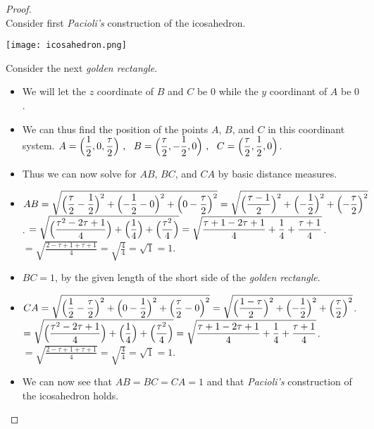 \documentclass[12pt]{article}
\theoremstyle{plain}
\begin{document}
\begin{proof}
  \ \\
  Consider first \textit{Pacioli's} construction of the icosahedron. \\
  \begin{center}
    \texttt{[image: icosahedron.png]}
  \end{center}
  Consider the next \textit{golden rectangle}. \\
  \begin{center}
  \end{center}
  \begin{itemize}
    \item We will let the $z$ coordinate of $B$ and $C$ be $0$ while the $y$ coordinant of $A$ be $0$.
    \item We can thus find the position of the points $A$, $B$, and $C$ in this coordinant system.
    \subitem $ \displaystyle A = \Bigl( \frac{1}{2}, 0, \frac{\tau}{2} \Bigr) \ , \ \ B = \Bigl( \frac{\tau}{2}, -\frac{1}{2}, 0 \Bigr) \ , \ \ C = \Bigl( \frac{\tau}{2}, \frac{1}{2}, 0 \Bigr) $.
    \item Thus we can now solve for $AB$, $BC$, and $CA$ by basic distance measures.
    \item $ \displaystyle AB = \sqrt{\Bigl( \frac{\tau}{2} - \frac{1}{2} \Bigr)^2 + \Bigl( -\frac{1}{2} - 0 \Bigr)^2 + \Bigl( 0 - \frac{\tau}{2} \Bigr)^2} = \sqrt{\Bigl( \frac{\tau - 1}{2} \Bigr)^2 + \Bigl( -\frac{1}{2} \Bigr)^2 + \Bigl( - \frac{\tau}{2} \Bigr)^2} $.
    \subitem $ \displaystyle = \sqrt{\Bigl( \frac{\tau^2 -2\tau + 1}{4} \Bigr) + \Bigl( \frac{1}{4} \Bigr) + \Bigl( \frac{\tau^2}{4} \Bigr)} = \sqrt{ \frac{\tau + 1 -2\tau + 1}{4} + \frac{1}{4} + \frac{\tau + 1}{4} } $.
    \subitem $ \displaystyle = \sqrt{ \frac{2 -\tau + 1 + \tau + 1}{4} } = \sqrt{\frac{4}{4}} = \sqrt{1} = 1 $.
    \item $ BC = 1 $, by the given length of the short side of the \textit{golden rectangle}.
    \item $ \displaystyle CA = \sqrt{\Bigl( \frac{1}{2} - \frac{\tau}{2} \Bigr)^2 + \Bigl( 0 - \frac{1}{2} \Bigr)^2 + \Bigl( \frac{\tau}{2} - 0 \Bigr)^2} = \sqrt{\Bigl( \frac{1 - \tau}{2} \Bigr)^2 + \Bigl( - \frac{1}{2} \Bigr)^2 + \Bigl( \frac{\tau}{2} \Bigr)^2} $.
    \subitem $ \displaystyle = \sqrt{\Bigl( \frac{\tau^2 -2\tau + 1}{4} \Bigr) + \Bigl( \frac{1}{4} \Bigr) + \Bigl( \frac{\tau^2}{4} \Bigr)} = \sqrt{ \frac{\tau + 1 -2\tau + 1}{4} + \frac{1}{4} + \frac{\tau + 1}{4} } $.
    \subitem $ \displaystyle = \sqrt{ \frac{2 -\tau + 1 + \tau + 1}{4} } = \sqrt{\frac{4}{4}} = \sqrt{1} = 1 $.
    \item We can now see that $AB=BC=CA=1$ and that \textit{Pacioli's} construction of the icosahedron holds.
  \end{itemize} 
\end{proof}
\end{document}
